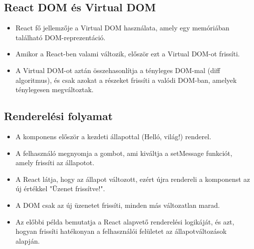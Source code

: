 \documentclass[colorlinks]{thesis-kando}
\theoremstyle{definition}
\theoremstyle{remark}
\begin{document}
\subsection{React DOM és Virtual DOM}
\begin{itemize}
    \item React fő jellemzője a Virtual DOM használata, amely egy
    memóriában található DOM-reprezentáció.
    \item Amikor a React-ben valami változik, először ezt a Virtual
    DOM-ot frissíti.
    \item A Virtual DOM-ot aztán összehasonlítja a tényleges
    DOM-mal (diff algoritmus), és csak azokat a részeket frissíti
    a valódi DOM-ban, amelyek ténylegesen megváltoztak.
\end{itemize}
\subsection{Renderelési folyamat}
\begin{itemize}
    \item A komponens először a kezdeti állapottal (Helló, világ!)
    renderel.
    \item A felhasználó megnyomja a gombot, ami kiváltja a setMessage
    funkciót, amely frissíti az állapotot.
    \item A React látja, hogy az állapot változott, ezért újra rendereli a
    komponenst az új értékkel "Üzenet frissítve!".
    \item A DOM csak az új üzenetet frissíti, minden más változatlan
    marad.
    \item Az előbbi példa bemutatja a React alapvető renderelési
    logikáját, és azt, hogyan frissíti hatékonyan a felhasználói
    felületet az állapotváltozások alapján.

\end{itemize}
\end{document}
